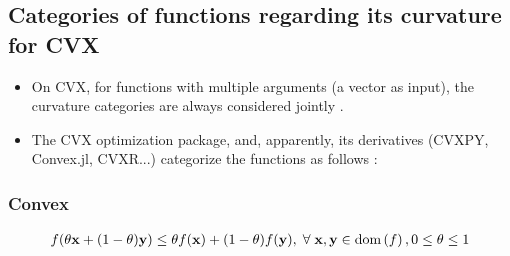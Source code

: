 \documentclass{article}
\newcommand{\dom}[1]{\ensuremath{\textnormal{dom}\left(#1\right)}} %
\begin{document}
\subsection{Categories of functions regarding its curvature for CVX}
\begin{itemize}
    \item On CVX, for functions with multiple arguments (a vector as input), the curvature categories are always considered jointly \autocite{DCPRulesetCVX}.
	\item The CVX optimization package, and, apparently, its derivatives (CVXPY, Convex.jl, CVXR...) categorize the functions as follows \autocite{DCPRulesetCVX}:
\end{itemize}
\subsubsection{Convex}
\begin{align}
    f(\theta\mathbf{x}+(1-\theta)\mathbf{y}) \leq \theta f(\mathbf{x}) + (1-\theta)f(\mathbf{y}),\;\forall\; \mathbf{x}, \mathbf{y} \in \dom{f}, 0\leq\theta\leq 1
    \label{eq:convex-rule}
\end{align}
\end{document}
